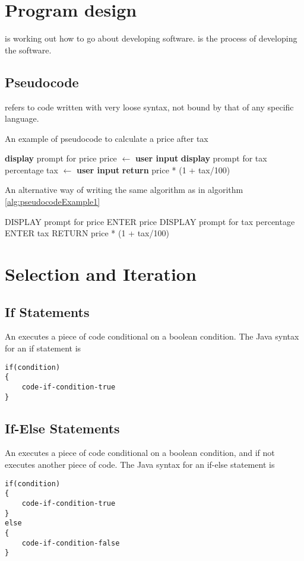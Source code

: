 \documentclass[11pt]{article}
\begin{document}
\pagebreak
\section{Program design}
\begin{defi}
     is working out how to go about developing software.  is the process of developing the software.
\end{defi}
\subsection{Pseudocode}
 refers to code written with very loose syntax, not bound by that of any specific language.
\begin{algorithm}
    \caption{An example of pseudocode to calculate a price after tax}
    \label{alg:pseudocodeExample1}
    \textbf{display} prompt for price\;
    price $\gets$ \textbf{user input}\;
    \textbf{display} prompt for tax percentage\;
    tax $\gets$ \textbf{user input}\;
    \textbf{return} price * (1 + tax/100)\;
\end{algorithm}
\begin{algorithm}
    \caption{An alternative way of writing the same algorithm as in algorithm \ref{alg:pseudocodeExample1}}
    DISPLAY prompt for price\;
    ENTER price\;
    DISPLAY prompt for tax percentage\;
    ENTER tax\;
    RETURN price * (1 + tax/100)\;
\end{algorithm}
\pagebreak


\section{Selection and Iteration}
\subsection{If Statements}
An  executes a piece of code conditional on a boolean condition. The Java syntax for an if statement is
\vspace{-20pt}
\begin{lstlisting}[style=basic]
if(condition)
{
    code-if-condition-true
}
\end{lstlisting}
\subsection{If-Else Statements}
An  executes a piece of code conditional on a boolean condition, and if not executes another piece of code. The Java syntax for an if-else statement is
\vspace{-20pt}
\begin{lstlisting}[style=basic]
if(condition)
{
    code-if-condition-true
}
else
{
    code-if-condition-false
}
\end{lstlisting}
\end{document}
